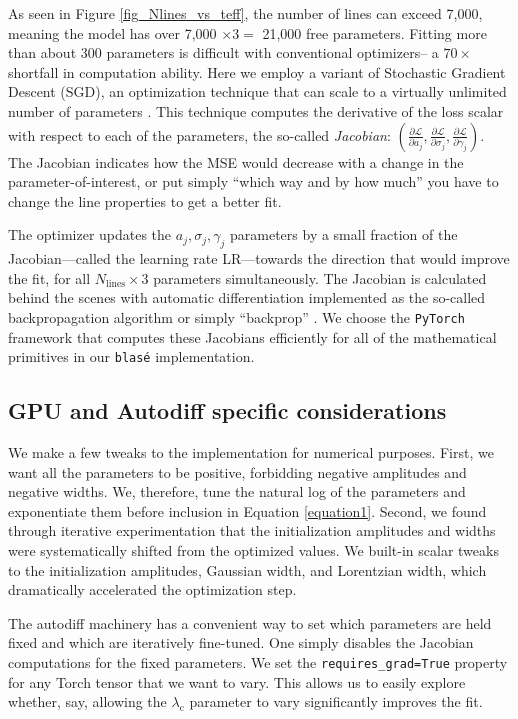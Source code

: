 \documentclass[modern]{aastex631}
\begin{document}
As seen in Figure \ref{fig_Nlines_vs_teff}, the number of lines can exceed 7,000, meaning the model has over 7,000 $\times 3 =$ 21,000 free parameters. Fitting more than about 300 parameters is difficult with conventional optimizers-- a $70\times$ shortfall in computation ability.  Here we employ a variant of Stochastic Gradient Descent (SGD), an optimization technique that can scale to a virtually unlimited number of parameters \citep{2016arXiv160904747R}. This technique computes the derivative of the loss scalar with respect to each of the parameters, the so-called \emph{Jacobian}: $(\frac{\partial \mathcal{L}}{\partial a_j}, \frac{\partial \mathcal{L}}{\partial \sigma_j}, \frac{\partial \mathcal{L}}{\partial \gamma_j})$. The Jacobian indicates how the MSE would decrease with a change in the parameter-of-interest, or put simply ``which way and by how much'' you have to change the line properties to get a better fit.

The optimizer updates the $a_j, \sigma_j, \gamma_j$ parameters by a small fraction of the Jacobian---called the learning rate LR---towards the direction that would improve the fit, for all $N_{\mathrm{lines}} \times 3$ parameters simultaneously. The Jacobian is calculated behind the scenes with automatic differentiation implemented as the so-called backpropagation algorithm or simply ``backprop'' \citep{2015arXiv150205767G}. We choose the \texttt{PyTorch} framework that computes these Jacobians efficiently for all of the mathematical primitives in our \texttt{blas\'e} implementation.


\subsection{GPU and Autodiff specific considerations}
We make a few tweaks to the implementation for numerical purposes. First, we want all the parameters to be positive, forbidding negative amplitudes and negative widths. We, therefore, tune the natural log of the parameters and exponentiate them before inclusion in Equation \ref{equation1}. Second, we found through iterative experimentation that the initialization amplitudes and widths were systematically shifted from the optimized values. We built-in scalar tweaks to the initialization amplitudes, Gaussian width, and Lorentzian width, which dramatically accelerated the optimization step.

The autodiff machinery has a convenient way to set which parameters are held fixed and which are iteratively fine-tuned.  One simply disables the Jacobian computations for the fixed parameters.  We set the \texttt{requires\_grad=True} property for any Torch tensor that we want to vary. This allows us to easily explore whether, say, allowing the $\lambda_\mathrm{c}$ parameter to vary significantly improves the fit.
\end{document}

